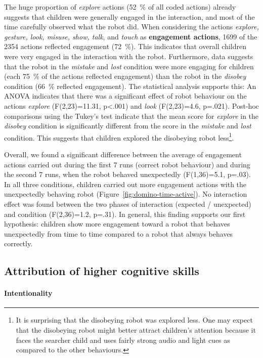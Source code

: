 \documentclass{sig-alternate}
\begin{document}
The huge proportion of \textit{explore} actions (52~\% of all coded actions)
already suggests that children were generally engaged in the interaction, and
most of the time carefully observed what the robot did. When considering the
actions \textit{explore, gesture, look, misuse, show, talk}, and \textit{touch}
as \textbf{engagement actions}, 1699 of the 2354 actions reflected engagement
(72~\%). This indicates that overall children were very engaged in the
interaction with the robot. Furthermore, data suggests that the robot in the
\textit{mistake} and \textit{lost} condition were more engaging for children
(each 75~\% of the actions reflected engagement) than the robot in the
\textit{disobey} condition (66~\% reflected engagement). The statistical
analysis supports this: An ANOVA indicates that there was a significant effect
of robot behaviour on the actions \textit{explore} (F(2,23)=11.31, p<.001) and
\textit{look} (F(2,23)=4.6, p=.021). Post-hoc comparisons using the Tukey's test
indicate that the mean score for \textit{explore} in the \textit{disobey}
condition is significantly different from the score in the \textit{mistake} and
\textit{lost} condition. This suggests that children explored the disobeying
robot less\footnote{It is surprising that the disobeying robot was explored
less. One may expect that the disobeying robot might better attract
children's attention because it faces the searcher child and uses fairly
strong audio and light cues as compared to the other behaviours.}. 

Overall, we found a significant difference between the average of engagement
actions carried out during the first 7 runs (correct robot behaviour) and during
the second 7 runs, when the robot behaved unexpectedly (F(1,36)=5.1, p=.03). In
all three conditions, children carried out more engagement actions with the
unexpectedly behaving robot (Figure~\ref{fig:domino-time-active}). No
interaction effect was found between the two phases of interaction (expected /
unexpected) and condition (F(2,36)=1.2, p=.31). In general, this finding
supports our first hypothesis: children show more engagement toward a robot that
behaves unexpectedly from time to time compared to a robot that always behaves
correctly.

\subsection{Attribution of higher cognitive skills}

\paragraph{Intentionality}
\end{document}
